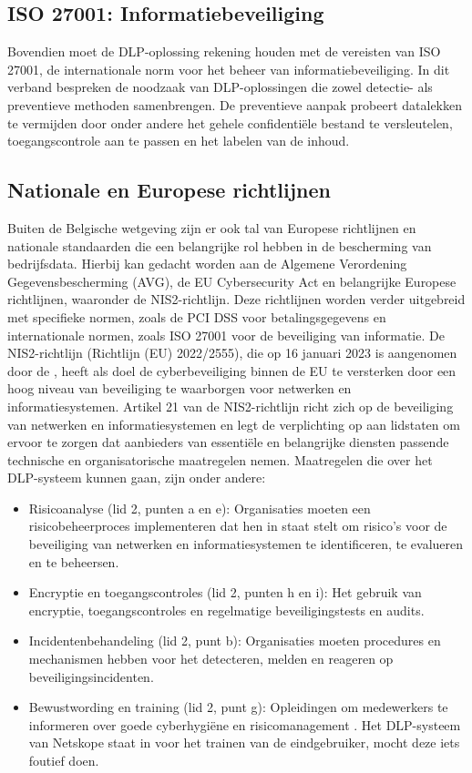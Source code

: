 \subsection{ISO 27001: Informatiebeveiliging}%

Bovendien moet de DLP-oplossing rekening houden met de vereisten van ISO 27001, de internationale norm voor het beheer van informatiebeveiliging. 
In dit verband bespreken \textcite{Alsanabani2020} de noodzaak van DLP-oploss\-ingen die zowel detectie- als preventieve methoden samenbrengen. 
De preventieve aanpak probeert datalekken te vermijden door onder andere het gehele confidentiële bestand te versleutelen, toegangscontrole aan te passen en het labelen van de inhoud.

\subsection{Nationale en Europese richtlijnen}%

Buiten de Belgische wetgeving zijn er ook tal van Europese richtlijnen en nationale standaarden die een belangrijke rol hebben in de bescherming van bedrijfsdata. 
Hierbij kan gedacht worden aan de Algemene Verordening Gegevensbescherming (AVG), de EU Cybersecurity Act en belangrijke Europese richtlijnen, waaronder de NIS2-richtlijn. 
Deze richtlijnen worden verder uitgebreid met specifieke normen, zoals de PCI DSS voor betalingsgegevens en internationale normen, zoals ISO 27001 voor de beveiliging van informatie. 
De NIS2-richtlijn (Richtlijn (EU) 2022/2555), die op 16 januari 2023 is aangenomen door de \textcite{nis2directive}, 
heeft als doel de cyberbeveiliging binnen de EU te versterken door een hoog niveau van beveiliging te waarborgen voor netwerken en informatiesystemen. 
Artikel 21 van de NIS2-richtlijn richt zich op de beveiliging van netwerken en informatiesystemen en legt de verplichting op aan lidstaten om 
ervoor te zorgen dat aanbieders van essentiële en belangrijke diensten passende technische en organisatorische maatregelen nemen. 
Maatregelen die over het DLP-systeem kunnen gaan, zijn onder andere: 

\begin{itemize}
    \item Risicoanalyse (lid 2, punten a en e): Organisaties moeten een risicobeheerproces implementeren dat hen in staat stelt om risico's voor de beveiliging van netwerken en informatiesystemen te identificeren, te evalueren en te beheersen.
    \item Encryptie en toegangscontroles (lid 2, punten h en i): Het gebruik van encryptie, toegangscontroles en regelmatige beveiligingstests en audits.
    \item Incidentenbehandeling (lid 2, punt b): Organisaties moeten procedures en mechanismen hebben voor het detecteren, melden en reageren op beveiligingsincidenten.
    \item Bewustwording en training (lid 2, punt g): Opleidingen om medewerkers te informeren over goede cyberhygiëne en risicomanagement \autocite{nis2directive}. Het DLP-systeem van Netskope staat in voor het trainen van de eindgebruiker, mocht deze iets foutief doen.
\end{itemize}

